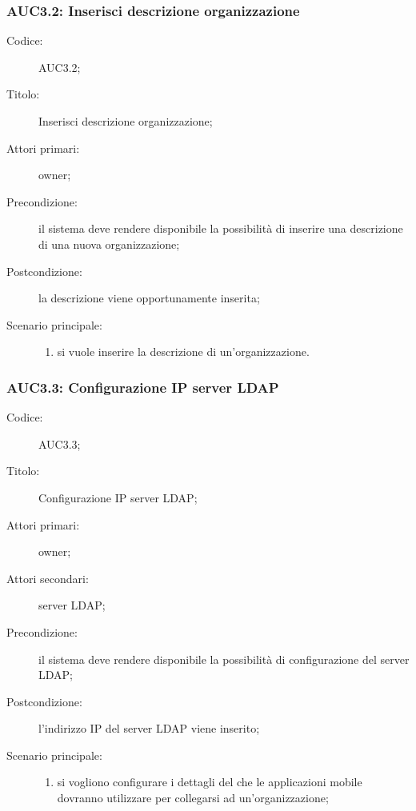 \documentclass[../../../analisi-dei-requisiti.tex]{subfiles}
\begin{document}
\subsubsection{AUC3.2: Inserisci descrizione organizzazione}%
\label{subs:AUC3.2}
\begin{description}
  \item[Codice:] AUC3.2;
  \item[Titolo:] Inserisci descrizione organizzazione;
  \item[Attori primari:] owner;
  \item[Precondizione:] il sistema deve rendere disponibile la possibilità di inserire una descrizione di una nuova organizzazione;
  \item[Postcondizione:] la descrizione viene opportunamente inserita;
  \item[Scenario principale:]
        \begin{enumerate}
          \item si vuole inserire la descrizione di un'organizzazione.
        \end{enumerate}
\end{description}

\subsubsection{AUC3.3: Configurazione IP server LDAP}%
\label{subs:AUC3.3}
\begin{description}
  \item[Codice:] AUC3.3;
  \item[Titolo:] Configurazione IP server LDAP\@;
  \item[Attori primari:] owner;
  \item[Attori secondari:] server LDAP\@;
  \item[Precondizione:] il sistema deve rendere disponibile la possibilità di configurazione del server LDAP\@;
  \item[Postcondizione:] l'indirizzo IP del server LDAP viene inserito;
  \item[Scenario principale:]
        \begin{enumerate}
          \item si vogliono configurare i dettagli del  che le applicazioni mobile dovranno utilizzare per collegarsi ad un'organizzazione;
        \end{enumerate}
\end{description}
\end{document}
